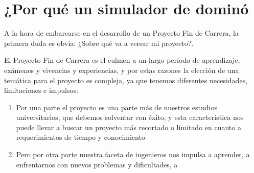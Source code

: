 

\section{¿Por qué un simulador de dominó}

A la hora de embarcarse en el desarrollo de un Proyecto Fin de Carrera, la primera duda es obvia: ¿Sobre qué va a versar mi proyecto?.

El Proyecto Fin de Carrera es el culmen a un largo período de aprendizaje, exámenes y vivencias y experiencias, y por estas razones la elección de una temática para el proyecto es compleja, ya que tenemos diferentes necesidades, limitaciones e impulsos:
\begin{enumerate}
    \item Por una parte el proyecto es una parte más de nuestros estudios universitarios, que debemos solventar con éxito, y esta característica nos puede llevar a buscar un proyecto más recortado o limitado en cuanto a requerimientos de tiempo y conocimiento
    \item Pero por otra parte nuestra faceta de ingenieros nos impulsa a aprender, a enfrentarnos con nuevos problemas y dificultades, a 
\end{enumerate}
